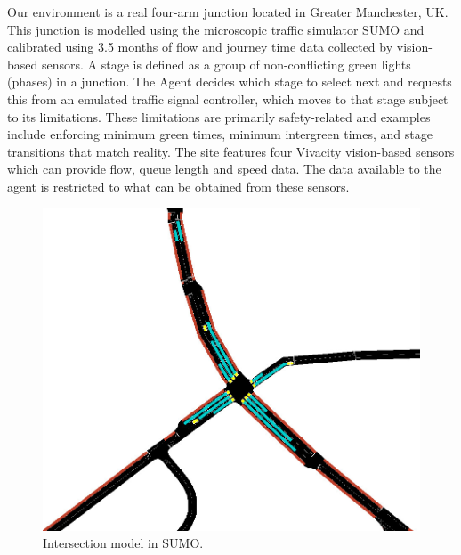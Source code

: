 \documentclass[conference]{IEEEtran}
\begin{document}
Our environment is a real four-arm junction located in Greater Manchester, UK.
This junction is modelled using the microscopic traffic simulator SUMO \cite{sumo} and calibrated using 3.5 months of flow and journey time data collected by vision-based sensors.
A stage is defined as a group of non-conflicting green lights (phases) in a junction.
The Agent decides which stage to select next and requests this from an emulated traffic signal controller, which moves to that stage subject to its limitations. These limitations are primarily safety-related and examples include enforcing minimum green times, minimum intergreen times, and stage transitions that match reality.
The site features four Vivacity vision-based sensors which can provide flow, queue length and speed data. The data available to the agent is restricted to what can be obtained from these sensors.

\begin{figure}[thpb]
    \centering
    \includegraphics[width=\linewidth]{figures/intersection.png}
    \caption{Intersection model in SUMO.}
    \label{fig:intersection}
\end{figure}
\end{document}
